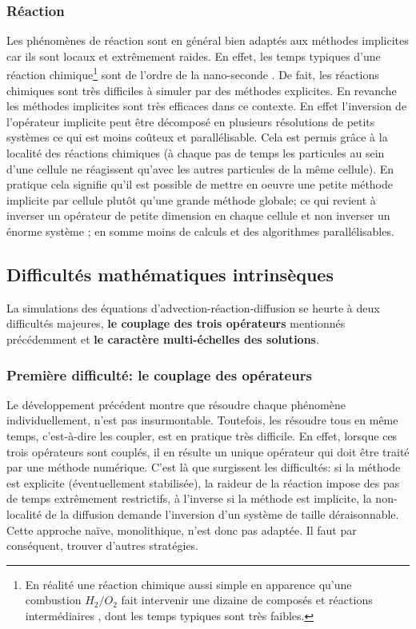 \subsubsection{Réaction}
    Les phénomènes de réaction sont en général bien adaptés aux méthodes implicites car ils sont locaux et extrêmement raides.
    En effet, les temps typiques d'une réaction chimique\footnote{
    En réalité une réaction chimique aussi simple en apparence qu'une combustion $H_2/O_2$ fait intervenir une dizaine de composés et réactions intermédiaires \cite{OConaire2004}, dont les temps typiques sont très faibles.} sont de l'ordre de la nano-seconde \cite{Wartha2021}.
    De fait, les réactions chimiques sont très difficiles à simuler par des méthodes explicites.
    En revanche les méthodes implicites sont très efficaces dans ce contexte. En effet l'inversion de l'opérateur implicite 
    peut être décomposé en plusieurs résolutions de petits systèmes ce qui est moins coûteux et parallélisable. Cela est permis grâce à la localité des réactions chimiques
    (à chaque pas de temps les particules au sein d'une cellule ne réagissent qu'avec les autres particules de la même cellule).
    En pratique cela signifie qu'il est possible de mettre en oeuvre une petite méthode implicite par cellule plutôt qu'une grande méthode globale; 
    ce qui revient à inverser un opérateur de petite dimension en chaque cellule et non inverser un énorme système ; en somme moins de calculs et des algorithmes parallélisables.

\subsection{Difficultés mathématiques intrinsèques}\label{par:adr_difficile}
    La simulations des équations d'advection-réaction-diffusion se heurte à deux difficultés majeures, \textbf{le couplage des trois opérateurs} mentionnés précédemment
    et \textbf{le caractère multi-échelles des solutions}.

    \subsubsection{Première difficulté: le couplage des opérateurs}
        Le développement précédent montre que résoudre chaque phénomène individuellement, n'est pas insurmontable. 
        Toutefois, les résoudre tous en même temps, c'est-à-dire les coupler, est en pratique très difficile.
        En effet, lorsque ces trois opérateurs sont couplés, il en résulte un unique opérateur qui doit être traité par une méthode numérique.
        C'est là que surgissent les difficultés: si la méthode est explicite (éventuellement stabilisée), la raideur de la réaction impose des pas de temps extrêmement restrictifs,
        à l'inverse si la méthode est implicite, la non-localité de la diffusion demande l'inversion d'un système de taille déraisonnable. 
        Cette approche naïve, monolithique, n'est donc pas adaptée. Il faut par conséquent, trouver d'autres stratégies.

